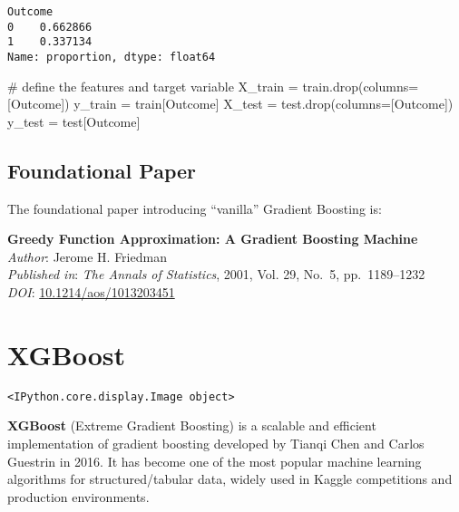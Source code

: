 \documentclass[
  letterpaper,
  DIV=11,
  numbers=noendperiod]{scrreprt}
\newenvironment{Shaded}{\begin{snugshade}}{\end{snugshade}}
\newcommand{\CommentTok}[1]{\textcolor[rgb]{0.37,0.37,0.37}{#1}}
\newcommand{\NormalTok}[1]{\textcolor[rgb]{0.00,0.23,0.31}{#1}}
\newcommand{\OperatorTok}[1]{\textcolor[rgb]{0.37,0.37,0.37}{#1}}
\newcommand{\StringTok}[1]{\textcolor[rgb]{0.13,0.47,0.30}{#1}}
\begin{document}
\begin{verbatim}
Outcome
0    0.662866
1    0.337134
Name: proportion, dtype: float64
\end{verbatim}

\begin{Shaded}
\begin{Highlighting}[]
\CommentTok{\# define the features and target variable}
\NormalTok{X\_train }\OperatorTok{=}\NormalTok{ train.drop(columns}\OperatorTok{=}\NormalTok{[}\StringTok{\textquotesingle{}Outcome\textquotesingle{}}\NormalTok{])}
\NormalTok{y\_train }\OperatorTok{=}\NormalTok{ train[}\StringTok{\textquotesingle{}Outcome\textquotesingle{}}\NormalTok{]}
\NormalTok{X\_test }\OperatorTok{=}\NormalTok{ test.drop(columns}\OperatorTok{=}\NormalTok{[}\StringTok{\textquotesingle{}Outcome\textquotesingle{}}\NormalTok{])}
\NormalTok{y\_test }\OperatorTok{=}\NormalTok{ test[}\StringTok{\textquotesingle{}Outcome\textquotesingle{}}\NormalTok{]}
\end{Highlighting}
\end{Shaded}

\section{Foundational Paper}\label{foundational-paper}

The foundational paper introducing ``vanilla'' Gradient Boosting is:

\textbf{Greedy Function Approximation: A Gradient Boosting Machine}\\
\emph{Author}: Jerome H. Friedman\\
\emph{Published in}: \emph{The Annals of Statistics}, 2001, Vol. 29,
No.~5, pp.~1189--1232\\
\emph{DOI}:
\href{https://doi.org/10.1214/aos/1013203451}{10.1214/aos/1013203451}

\chapter{XGBoost}\label{xgboost}

\begin{verbatim}
<IPython.core.display.Image object>
\end{verbatim}

\textbf{XGBoost} (Extreme Gradient Boosting) is a scalable and efficient
implementation of gradient boosting developed by Tianqi Chen and Carlos
Guestrin in 2016. It has become one of the most popular machine learning
algorithms for structured/tabular data, widely used in Kaggle
competitions and production environments.
\end{document}
